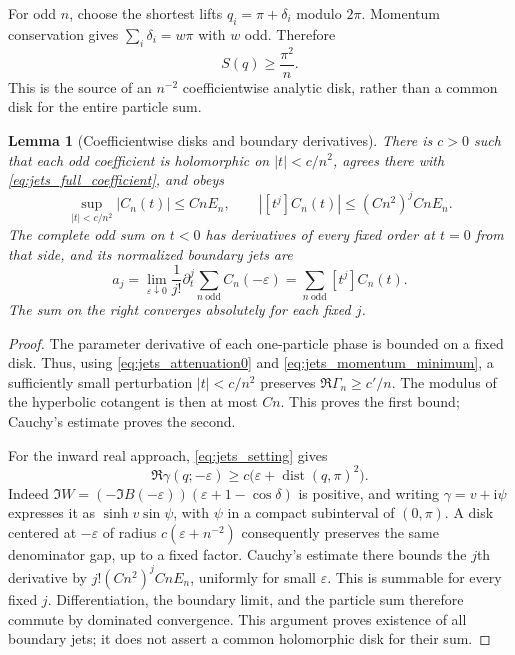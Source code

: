 \documentclass[11pt]{article}
\numberwithin{equation}{section}
\newtheorem{lemma}[theorem]{Lemma}
\theoremstyle{definition}
\newcommand{\ii}{\mathrm i}
\newcommand{\eps}{\varepsilon}
\newcommand{\dist}{\operatorname{dist}}
\begin{document}
For odd $n$, choose the shortest lifts $q_i=\pi+\delta_i$ modulo
$2\pi$. Momentum conservation gives
$\sum_i\delta_i=w\pi$ with $w$ odd. Therefore
\begin{equation}\label{eq:jets_momentum_minimum}
 S(q)\ge\frac{\pi^2}{n}.
\end{equation}
This is the source of an $n^{-2}$ coefficientwise analytic disk, rather
than a common disk for the entire particle sum.

\begin{lemma}[Coefficientwise disks and boundary derivatives]
\label{lem:jets_boundary_derivatives}
There is $c>0$ such that each odd coefficient is holomorphic on
$|t|<c/n^2$, agrees there with \eqref{eq:jets_full_coefficient}, and
obeys
\begin{equation}\label{eq:jets_small_disk}
 \sup_{|t|<c/n^2}|C_n(t)|\le CnE_n,
 \qquad |[t^j]C_n(t)|\le (Cn^2)^j CnE_n.
\end{equation}
The complete odd sum on $t<0$ has derivatives of every fixed order at
$t=0$ from that side, and its normalized boundary jets are
\begin{equation}\label{eq:jets_boundary_coefficients}
 a_j=\lim_{\eps\downarrow0}\frac1{j!}
       \partial_t^j\sum_{n\ \mathrm{odd}}C_n(-\eps)
     =\sum_{n\ \mathrm{odd}}[t^j]C_n(t).
\end{equation}
The sum on the right converges absolutely for each fixed $j$.
\end{lemma}

\begin{proof}
The parameter derivative of each one-particle phase is bounded on a
fixed disk. Thus, using \eqref{eq:jets_attenuation0} and
\eqref{eq:jets_momentum_minimum}, a sufficiently small perturbation
$|t|<c/n^2$ preserves $\Re\Gamma_n\ge c'/n$. The modulus of the
hyperbolic cotangent is then at most $Cn$. This proves the first bound;
Cauchy's estimate proves the second.

For the inward real approach, \eqref{eq:jets_setting} gives
\[
 \Re\gamma(q;-\eps)\ge
 c\bigl(\eps+\dist(q,\pi)^2\bigr).
\]
Indeed $\Im W=(-\Im B(-\eps))(\eps+1-\cos\delta)$ is positive,
and writing $\gamma=v+\ii\psi$ expresses it as
$\sinh v\sin\psi$, with $\psi$ in a compact subinterval of
$(0,\pi)$. A disk centered at $-\eps$ of radius
$c(\eps+n^{-2})$ consequently preserves the same denominator gap,
up to a fixed factor. Cauchy's estimate there bounds the $j$th
derivative by $j!(Cn^2)^j CnE_n$, uniformly for small $\eps$.
This is summable for every fixed $j$. Differentiation, the boundary
limit, and the particle sum therefore commute by dominated
convergence. This argument proves existence of all boundary jets; it
does not assert a common holomorphic disk for their sum.
\end{proof}
\end{document}
